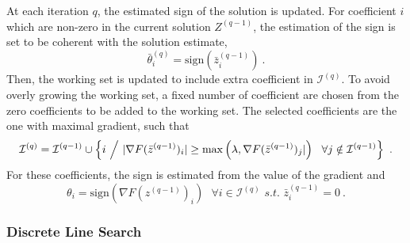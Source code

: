 \documentclass[../thesis.tex]{subfiles}
\begin{document}
	At each iteration $q$, the estimated sign of the solution is updated. For
	coefficient $i$ which are non-zero in the current solution $Z^{(q-1)}$,
	the estimation of the sign is set to be coherent with the solution estimate,
	\ie{}
	\[
		\bar \theta^{(q)}_i = \text{sign}\left(\bar z^{(q-1)}_i\right)~.
	\]
	Then, the working set is updated to include extra coefficient in $\mathcal I^{(q)}$.
	To avoid overly growing the working set, a fixed number of coefficient are chosen
	from the zero coefficients to be added to the working set. The selected
	coefficients are the one with maximal gradient, such that
	\begin{equation}
		\mathcal I^{(q)} = \mathcal I^{(q-1)} \cup \left \{ i~ \middle /~
				|\nabla F(\bar z^{(q-1)})_{i}| \ge \max\left(\lambda, \nabla F(\bar z^{(q-1)})_{j}|\right) ~~
				\forall j \notin \mathcal I^{(q-1)}\right \}~.
	\end{equation}
	For these coefficients, the sign is estimated from the value of the gradient
	and
	\begin{equation}
		\theta_i = \text{sign}\left(\nabla F(z^{(q-1)})_i\right) ~~~
		\forall i \in \mathcal I^{(q)} \textit{ s.t. } \bar z_i^{(q-1)} = 0~.
	\end{equation} 


\subsubsection{Discrete Line Search}
\label{par:line_search_fss}
\end{document}
